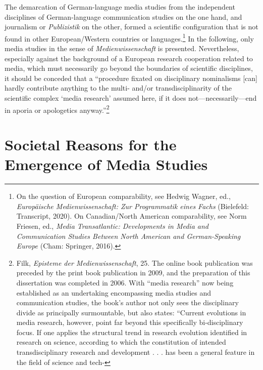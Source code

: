 \documentclass{tufte-handout}
\begin{document}
The demarcation of German-language media studies from the independent
disciplines of German-language communication studies on the one hand,
and journalism or \emph{Publizistik} on the other, formed a scientific
configuration that is not found in other European/Western countries or
languages.\footnote{On the question of European comparability, see
  Hedwig Wagner, ed., \emph{Europäische Medienwissenschaft: Zur
  Programmatik eines Fachs} (Bielefeld: Transcript, 2020). On
  Canadian/North American comparability, see Norm Friesen, ed.,
  \emph{Media Transatlantic: Developments in Media and Communication
  Studies Between North American and German-Speaking Europe} (Cham:
  Springer, 2016).} In the following, only media studies in the sense of
\emph{Medienwissenschaft} is presented. Nevertheless, especially against
the background of a European research cooperation related to media,
which must necessarily go beyond the boundaries of scientific
disciplines, it should be conceded that a ``procedure fixated on
disciplinary nominalisms {[}can{]} hardly contribute anything to the
multi- and/or transdisciplinarity of the scientific complex `media
research' assumed here, if it does not---necessarily---end in aporia or
apologetics anyway.''\footnote{Filk, \emph{Episteme der
  Medienwissenschaft}, 25. The online book publication was preceded by
  the print book publication in 2009, and the preparation of this
  dissertation was completed in 2006. With ``media research'' now being
  established as an undertaking encompassing media studies and
  communication studies, the book's author not only sees the
  disciplinary divide as principally surmountable, but also states:
  ``Current evolutions in media research, however, point far beyond this
  specifically bi-disciplinary focus. If one applies the structural
  trend in research evolution identified in research on science,
  according to which the constitution of intended transdisciplinary
  research and development . . . has been a general feature in the field
  of science and tech-}

\hypertarget{societal-reasons-for-the-emergence-of-media-studies}{%
\section{\texorpdfstring{Societal Reasons for the Emergence of Media
Studies
}{Societal Reasons for the Emergence of Media Studies }}\label{societal-reasons-for-the-emergence-of-media-studies}}
\end{document}

